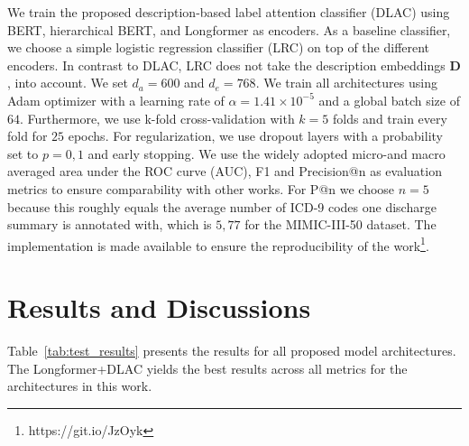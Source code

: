 \documentclass[11pt]{article}
\begin{document}
We train the proposed description-based label attention classifier (DLAC) using BERT, hierarchical BERT, and Longformer as encoders. As a baseline classifier, we choose a simple logistic regression classifier (LRC) on top of the different encoders. In contrast to DLAC, LRC does not take the description embeddings $\boldsymbol{D}$, into account. We set $d_a=600$ and $d_e=768$. We train all architectures using Adam optimizer with a learning rate of $\alpha=1.41\times 10^{-5}$ and a global batch size of $64$. Furthermore, we use k-fold cross-validation with $k=5$ folds and train every fold for $25$ epochs. For regularization, we use dropout layers with a probability set to $p=0,1$ and early stopping.
We use the widely adopted micro-and macro averaged area under the ROC curve (AUC), F1 and Precision@n as evaluation metrics to ensure comparability with other works. %
For P@n we choose $n=5$ because this roughly equals the average number of ICD-9 codes one discharge summary is annotated with, which is $5,77$ for the MIMIC-III-50 dataset. The implementation is made available to ensure the reproducibility of the work\footnote{https://git.io/JzOyk}.

\section{Results and Discussions}
Table~\ref{tab:test_results} presents the results for all proposed model architectures. The Longformer+DLAC yields the best results across all metrics for the architectures in this work.
\end{document}
